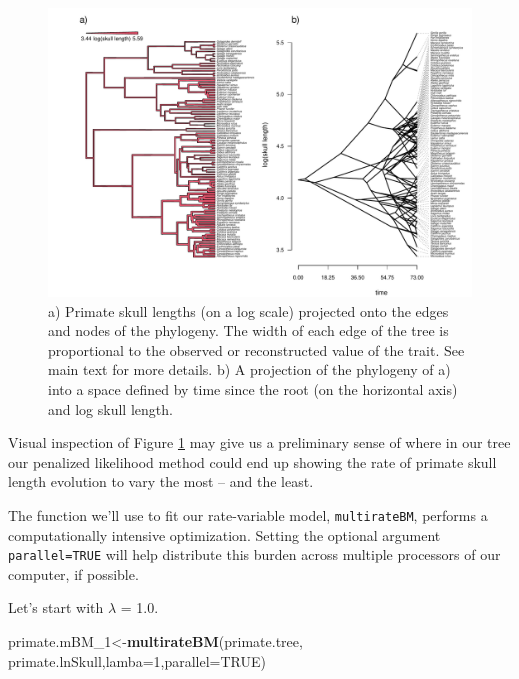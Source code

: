 \documentclass[fleqn,10pt,lineno]{wlpeerj} %
\newenvironment{Shaded}{\begin{snugshade}}{\end{snugshade}}
\newcommand{\AttributeTok}[1]{\textcolor[rgb]{0.13,0.29,0.53}{#1}}
\newcommand{\ConstantTok}[1]{\textcolor[rgb]{0.56,0.35,0.01}{#1}}
\newcommand{\DecValTok}[1]{\textcolor[rgb]{0.00,0.00,0.81}{#1}}
\newcommand{\FunctionTok}[1]{\textcolor[rgb]{0.13,0.29,0.53}{\textbf{#1}}}
\newcommand{\NormalTok}[1]{#1}
\newcommand{\OtherTok}[1]{\textcolor[rgb]{0.56,0.35,0.01}{#1}}
\begin{document}
\begin{figure}
\includegraphics[width=1\linewidth]{Revell.phytools-v2_peerj_files/figure-latex/primate-edgewidth-1} \caption{a) Primate skull lengths (on a log scale) projected onto the edges and nodes of the phylogeny. The width of each edge of the tree is proportional to the observed or reconstructed value of the trait. See main text for more details. b) A projection of the phylogeny of a) into a space defined by time since the root (on the horizontal axis) and log skull length.}\label{fig:primate-edgewidth}
\end{figure}

Visual inspection of Figure \ref{fig:primate-edgewidth} may give us a preliminary sense of where in our tree our penalized likelihood method could end up showing the rate of primate skull length evolution to vary the most -- and the least.

The function we'll use to fit our rate-variable model, \texttt{multirateBM}, performs a computationally intensive optimization. Setting the optional argument \texttt{parallel=TRUE} will help distribute this burden across multiple processors of our computer, if possible.

Let's start with \(\lambda\) = 1.0.

\begin{Shaded}
\begin{Highlighting}[]
\NormalTok{primate.mBM\_1}\OtherTok{\textless{}{-}}\FunctionTok{multirateBM}\NormalTok{(primate.tree,}
\NormalTok{  primate.lnSkull,}\AttributeTok{lamba=}\DecValTok{1}\NormalTok{,}\AttributeTok{parallel=}\ConstantTok{TRUE}\NormalTok{)}
\end{Highlighting}
\end{Shaded}
\end{document}
